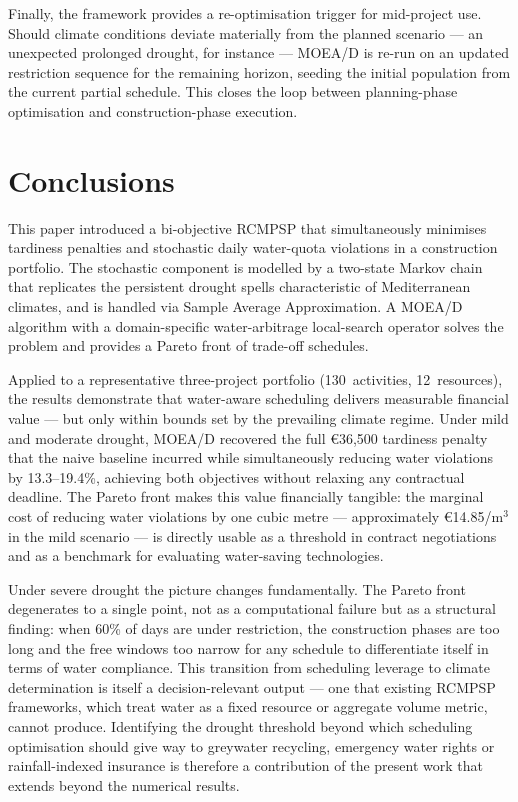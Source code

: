 \documentclass[12pt,a4paper]{article}
\begin{document}
Finally, the framework provides a re-optimisation trigger for mid-project use.
Should climate conditions deviate materially from the planned scenario — an
unexpected prolonged drought, for instance — MOEA/D is re-run on an updated
restriction sequence for the remaining horizon, seeding the initial population
from the current partial schedule.  This closes the loop between planning-phase
optimisation and construction-phase execution.

\section{Conclusions}
\label{sec:conc}

This paper introduced a bi-objective RCMPSP that simultaneously minimises tardiness
penalties and stochastic daily water-quota violations in a construction portfolio.
The stochastic component is modelled by a two-state Markov chain that replicates the
persistent drought spells characteristic of Mediterranean climates, and is handled
via Sample Average Approximation.  A MOEA/D algorithm with a domain-specific
water-arbitrage local-search operator solves the problem and provides a Pareto front
of trade-off schedules.

Applied to a representative three-project portfolio (130~activities, 12~resources),
the results demonstrate that water-aware scheduling delivers measurable financial
value — but only within bounds set by the prevailing climate regime.  Under mild
and moderate drought, MOEA/D recovered the full \euro36,500 tardiness penalty that
the naive baseline incurred while simultaneously reducing water violations by
13.3--19.4\%, achieving both objectives without relaxing any contractual deadline.
The Pareto front makes this value financially tangible: the marginal cost of
reducing water violations by one cubic metre — approximately \euro14.85/m$^3$ in
the mild scenario — is directly usable as a threshold in contract negotiations and
as a benchmark for evaluating water-saving technologies.

Under severe drought the picture changes fundamentally.  The Pareto front
degenerates to a single point, not as a computational failure but as a structural
finding: when 60\% of days are under restriction, the construction phases are too
long and the free windows too narrow for any schedule to differentiate itself in
terms of water compliance.  This transition from scheduling leverage to climate
determination is itself a decision-relevant output — one that existing RCMPSP
frameworks, which treat water as a fixed resource or aggregate volume metric,
cannot produce.  Identifying the drought threshold beyond which scheduling
optimisation should give way to greywater recycling, emergency water rights or
rainfall-indexed insurance is therefore a contribution of the present work that
extends beyond the numerical results.
\end{document}
